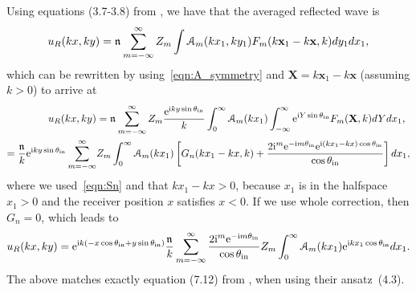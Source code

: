\documentclass[12pt, a4paper]{article}
\begin{document}
Using equations (3.7-3.8) from \cite{gower_reflection_2018}, we have that the averaged reflected wave is
\begin{equation}
  u_R(kx,ky) = \mathfrak n_{} \sum_{m=-\infty}^\infty Z_m \int \mathcal A_m(kx_1,ky_1) F_m(k\mathbf x_1 - k\mathbf x,k) dy_1 dx_1,
\end{equation}
which can be rewritten by using~\eqref{eqn:A_symmetry} and $\mathbf X = k\mathbf x_1 - k\mathbf x$ (assuming $k>0$) to arrive at
\begin{align}
  u_R(kx,ky) &= \mathfrak n_{} \sum_{m=-\infty}^\infty Z_m \frac{\textrm{e}^{ \textrm{i} k y \sin \theta_{\mathrm{in}}}}{k} \int_{0}^\infty \mathcal A_m(kx_1) \int_{-\infty}^\infty \textrm{e}^{ \textrm{i} Y \sin \theta_{\mathrm{in}}} F_m(\mathbf X,k) dY dx_1,
  \\ \notag
   =  \frac{\mathfrak n_{}}{k} \textrm{e}^{ \textrm{i} k y \sin \theta_{\mathrm{in}}} \sum_{m=-\infty}^\infty &Z_m \int_{0}^\infty \mathcal A_m(kx_1) \left [ G_n(kx_1 - k x, k) + \frac{2 \textrm{i}^m \textrm{e}^{-\textrm{i} m \theta_{\mathrm{in}}} \textrm{e}^{\textrm{i} (kx_1 - k x) \cos \theta_{\mathrm{in}}}}{\cos \theta_{\mathrm{in}}} \right] d x_1,
\end{align}
where we used~\eqref{eqn:Sn} and that $kx_1 - k x > 0$, because $x_1$ is in the halfspace $x_1 >0$ and the receiver position $x$ satisfies $x<0$. If we use whole correction, then $G_n = 0$, which leads to
\begin{equation}
  u_R(kx,ky) =   \textrm{e}^{ \textrm{i} k ( - x \cos \theta_{\mathrm{in}} + y \sin \theta_{\mathrm{in}} )} \frac{\mathfrak n_{}}{k} \sum_{m=-\infty}^\infty \frac{2 \textrm{i}^m \textrm{e}^{-\textrm{i} m \theta_{\mathrm{in}}}}{\cos \theta_{\mathrm{in}}} Z_m  \int_{0}^\infty \mathcal A_m(kx_1) \textrm{e}^{\textrm{i} k x_1 \cos \theta_{\mathrm{in}}}  d x_1.
\end{equation}
The above matches exactly equation (7.12) from \cite{gower_reflection_2018}, when using their ansatz~(4.3).
\printbibliography

% 
% 
\end{document}
